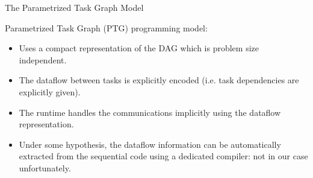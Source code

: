 \documentclass{beamer}
\newcommand{\db}[1]{\textcolor{mblue}{#1\xspace}}
\begin{document}
\begin{frame}{The Parametrized Task Graph Model}
  
  \alert{Parametrized Task Graph} (PTG) programming model:

  \begin{itemize}
  \item Uses a \db{compact representation} of the DAG which is problem
    size independent.
  \item The dataflow between tasks is \db{explicitly} encoded
    (i.e. task dependencies are explicitly given).
  \item The runtime handles the communications implicitly using the
    dataflow representation.
  \item Under some hypothesis, the dataflow information can be
    \db{automatically} extracted from the sequential code using a dedicated
    compiler: \alert{not in our case} unfortunately.
  \end{itemize}

\end{frame}
\end{document}
